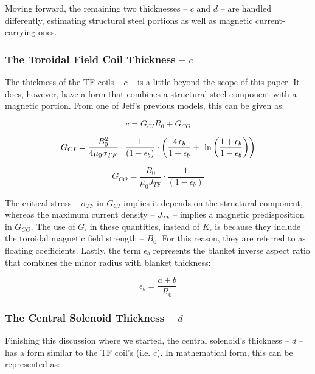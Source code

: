 Moving forward, the remaining two thicknesses -- $c$ and $d$ -- are handled differently, estimating structural steel portions as well as magnetic current-carrying ones.

\subsubsection{The Toroidal Field Coil Thickness -- $c$}

The thickness of the TF coils -- $c$ -- is a little beyond the scope of this paper. It does, however, have a form that combines a structural steel component with a magnetic portion. From one of Jeff's previous models, this can be given as:

\begin{equation}
	\label{eq:cc}
	c = G_{CI} R_0 + G_{CO}
\end{equation}

\begin{equation}
	G_{CI} = \frac{B_{0}^2}{ 4 \mu_0 \sigma_{TF} } \cdot \frac{1}{ ( 1 - \epsilon_b )}  \cdot \left( \frac{ 4 \, \epsilon_b}{1+\epsilon_b} + \ \textnormal{ln} \left( \frac{1+\epsilon_b}{1-\epsilon_b} \right) \right) 
\end{equation}

\begin{equation}
	G_{CO} = \frac{B_{0}}{ \mu_0 J_{TF} } \cdot \frac{1}{ ( 1 - \epsilon_b )}
\end{equation}

The critical stress -- $\sigma_{TF}$ in $G_{CI}$ implies it depends on the structural component, whereas the maximum current density -- $J_{TF}$ -- implies a magnetic predisposition in $G_{CO}$. The use of $G_\square$ in these quantities, instead of $K_\square$ is because they include the toroidal magnetic field strength -- $B_0$. For this reason, they are referred to as floating coefficients. Lastly, the term $\epsilon_b$ represents the blanket inverse aspect ratio that combines the minor radius with blanket thickness:

\begin{equation}
	\epsilon_b = \frac{ a + b }{R_0}
\end{equation}

\subsubsection{The Central Solenoid Thickness -- $d$}

Finishing this discussion where we started, the central solenoid's thickness -- $d$ -- has a form similar to the TF coil's (i.e. $c$). In mathematical form, this can be represented as:

